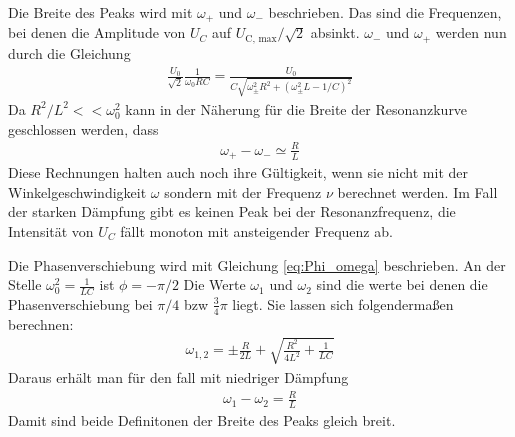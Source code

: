 Die Breite des Peaks wird mit $\omega_+$ und $\omega_-$ beschrieben.
Das sind die Frequenzen, bei denen die Amplitude von $U_C$ auf $U_\text{C, max}/\sqrt{2}$ absinkt.
$\omega_-$ und $\omega_+$ werden nun durch die Gleichung
\begin{align*}
    \frac{U_0}{\sqrt{2}} \frac{1}{\omega_0 RC} = \frac{U_0}{C\sqrt{\omega_\pm^2 R^2 + \left(\omega_\pm^2 L - 1/C\right)^2}}
\end{align*}
Da $R^2/ L^2 << \omega_0^2$ kann in der Näherung für die Breite der Resonanzkurve geschlossen werden, dass
\begin{align}
    \omega_+ - \omega_- \simeq \frac{R}{L}
    \label{eq:omega_Breite_pm}
\end{align}
Diese Rechnungen halten auch noch ihre Gültigkeit, 
wenn sie nicht mit der Winkelgeschwindigkeit $\omega$ sondern mit der Frequenz $\nu$ berechnet werden.
Im Fall der starken Dämpfung gibt es keinen Peak bei der Resonanzfrequenz, 
die Intensität von $U_C$ fällt monoton mit ansteigender Frequenz ab.

Die Phasenverschiebung wird mit Gleichung \eqref{eq:Phi_omega} beschrieben.
An der Stelle $\omega_0^2 = \frac{1}{LC}$ ist $\phi = -\pi/2$
Die Werte $\omega_1$ und $\omega_2$ sind die werte bei denen die Phasenverschiebung bei $\pi/4$ bzw $\frac{3}{4}\pi$ liegt.
Sie lassen sich folgendermaßen berechnen:
\begin{align}
    \omega_{1,2} = \pm \frac{R}{2L} + \sqrt{\frac{R^2}{4L^2} + \frac{1}{LC}}
    \label{eq:omega12}
\end{align}
Daraus erhält man für den fall mit niedriger Dämpfung
\begin{align}
    \omega_1 -\omega_2 = \frac{R}{L}
    \label{eq:omega_Breite_12}
\end{align}
Damit sind beide Definitonen der Breite des Peaks gleich breit.
